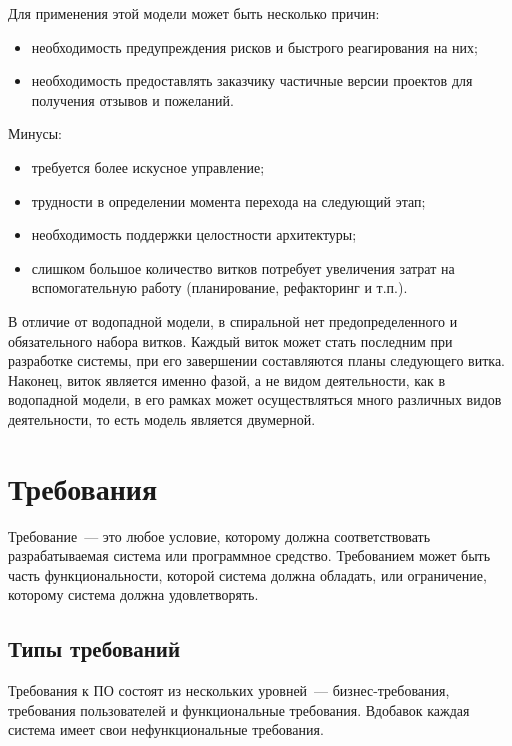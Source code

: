 \documentclass{../../text-style}
\begin{document}
Для применения этой модели может быть несколько причин:

\begin{itemize}
    \item необходимость предупреждения рисков и быстрого реагирования на них;
    \item необходимость предоставлять заказчику частичные версии проектов для получения отзывов и пожеланий.
\end{itemize}

Минусы:

\begin{itemize}
    \item требуется более искусное управление;
    \item трудности в определении момента перехода на следующий этап;
    \item необходимость поддержки целостности архитектуры;
    \item слишком большое количество витков потребует увеличения затрат на вспомогательную работу (планирование, рефакторинг и  т.п.).
\end{itemize}

В отличие от водопадной модели, в спиральной нет предопределенного и обязательного набора витков.
Каждый виток может стать последним при разработке системы, при его завершении составляются планы следующего витка.
Наконец, виток является именно фазой, а не видом деятельности, как в водопадной модели, в его рамках может осуществляться много различных видов деятельности, то есть модель является двумерной.

\section{Требования}

Требование~--- это любое условие, которому должна соответствовать разрабатываемая система или программное средство. 
Требованием может быть часть функциональности, которой система должна обладать, или ограничение, которому система должна удовлетворять.

\subsection{Типы требований}

Требования к ПО состоят из нескольких уровней~--- бизнес-требования, требования пользователей и функциональные требования. Вдобавок каждая система имеет свои нефункциональные требования.
\end{document}
